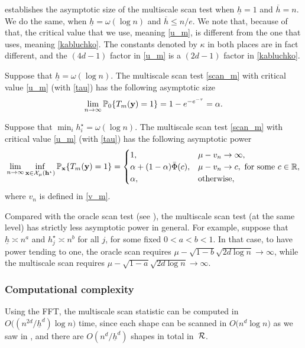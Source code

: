 \documentclass[twoside,11pt]{article}
\begin{document}
\citep[Th 1.2]{kabluchko2011extremes} establishes the asymptotic size of the multiscale scan test when $\underline h = 1$ and $\overline h = n$.  We do the same, when $\underline h = \omega(\log n)$ and $\overline h \le n/e$.  We note that, because of that, the critical value that we use, meaning \eqref{u_m}, is different from the one that \cite{kabluchko2011extremes} uses, meaning  \eqref{kabluchko}.  The constants denoted by $\kappa$ in both places are in fact different, and the $(4d-1)$ factor in \eqref{u_m} is a $(2 d-1)$ factor in \eqref{kabluchko}.

\begin{theorem}  \citep{kabluchko2011extremes}
\label{thm:multiscale_type1}
Suppose that $\underline h = \omega(\log n)$.
The multiscale scan test \eqref{scan_m} with critical value \eqref{u_m} (with \eqref{tau}) has the following asymptotic size 
\[ 
\lim_{n \rightarrow \infty} \mathbb{P}_0 \{T_m(\mathbf{y}) = 1\} = 1 - e^{-e^{-\tau}} = \alpha.
\]
\end{theorem}


\begin{theorem}
\label{thm:multiscale_type2}
Suppose that $\min_i h_i^\star = \omega(\log n)$. 
The multiscale scan test \eqref{scan_m} with critical value \eqref{u_m} (with \eqref{tau}) has the following asymptotic power 
\[
\lim_{n \rightarrow \infty} \inf_{\mathbf{x} \in \mathcal{X}_\mu(\mathbf{h}^\star)} \mathbb{P}_{\mathbf{x}} \{ T_m(\mathbf{y}) = 1 \} = 
\begin{cases}
1, &\mu - v_n \rightarrow \infty,\\
\alpha + (1 - \alpha) \bar\Phi(c), &\mu - v_n \rightarrow c, \textrm{ for some } c \in \mathbb{R},\\
\alpha, &\textrm{otherwise},
\end{cases}\]
where $v_n$ is defined in \eqref{v_m}.
\end{theorem}


Compared with the oracle scan test (see ), the multiscale scan test (at the same level) has strictly less asymptotic power in general.  For example, suppose that $\underline h \asymp n^a$ and $h_j^\star \asymp n^b$ for all $j$, for some fixed $0 < a < b < 1$.  In that case, to have power tending to one, the oracle scan requires $\mu - \sqrt{1-b} \sqrt{2 d \log n} \to \infty$, while the multiscale scan requires $\mu - \sqrt{1-a} \sqrt{2 d \log n} \to \infty$.


\subsubsection{Computational complexity}
Using the FFT, the multiscale scan statistic can be computed in $
O\big((n^{2d}/\underline h^d) \log n \big)$ time, since each shape can be scanned in $O\big(n^{d} \log n \big)$ as we saw in , and there are $O(n^d / \underline h^d)$ shapes in total in~$\mathcal{R}$.
\end{document}
